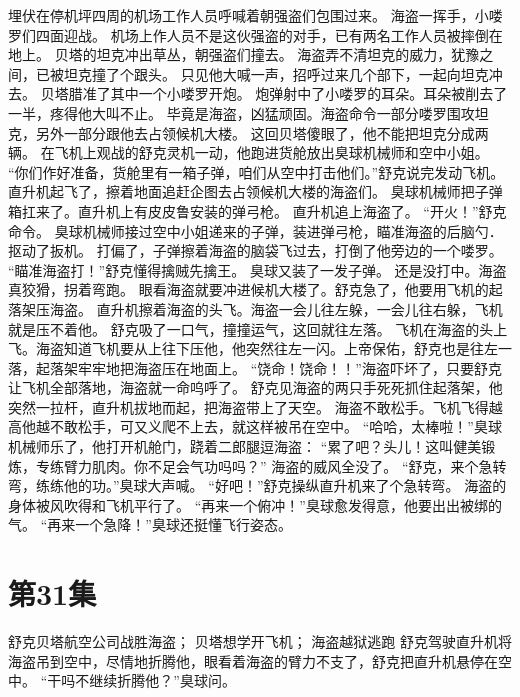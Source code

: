 \documentclass[a4paper,12pt,UTF8,twoside]{ctexbook}
\begin{document}
        埋伏在停机坪四周的机场工作人员呼喊着朝强盗们包围过来。 
        海盗一挥手，小喽罗们四面迎战。 
        机场上作人员不是这伙强盗的对手，已有两名工作人员被摔倒在地上。 
        贝塔的坦克冲出草丛，朝强盗们撞去。 
        海盗弄不清坦克的威力，犹豫之间，已被坦克撞了个跟头。 
        只见他大喊一声，招呼过来几个部下，一起向坦克冲去。 
        贝塔腊准了其中一个小喽罗开炮。 
        炮弹射中了小喽罗的耳朵。耳朵被削去了一半，疼得他大叫不止。 
        毕竟是海盗，凶猛顽固。海盗命令一部分喽罗围攻坦克，另外一部分跟他去占领候机大楼。 
        这回贝塔傻眼了，他不能把坦克分成两辆。 
        在飞机上观战的舒克灵机一动，他跑进货舱放出臭球机械师和空中小姐。 
        “你们作好准备，货舱里有一箱子弹，咱们从空中打击他们。”舒克说完发动飞机。 
        直升机起飞了，擦着地面追赶企图去占领候机大楼的海盗们。 
        臭球机械师把子弹箱扛来了。直升机上有皮皮鲁安装的弹弓枪。 
        直升机追上海盗了。 
        “开火！”舒克命令。 
        臭球机械师接过空中小姐递来的子弹，装进弹弓枪，瞄准海盗的后脑勺．抠动了扳机。 
        打偏了，子弹擦着海盗的脑袋飞过去，打倒了他旁边的一个喽罗。 
        “瞄准海盗打！”舒克懂得擒贼先擒王。 
        臭球又装了一发子弹。 
        还是没打中。海盗真狡猾，拐着弯跑。 
        眼看海盗就要冲进候机大楼了。舒克急了，他要用飞机的起落架压海盗。 
        直升机擦着海盗的头飞。海盗一会儿往左躲，一会儿往右躲，飞机就是压不着他。 
        舒克吸了一口气，撞撞运气，这回就往左落。 
        飞机在海盗的头上飞。海盗知道飞机要从上往下压他，他突然往左一闪。上帝保佑，舒克也是往左一落，起落架牢牢地把海盗压在地面上。 
        “饶命！饶命！！”海盗吓坏了，只要舒克让飞机全部落地，海盗就一命呜呼了。 
        舒克见海盗的两只手死死抓住起落架，他突然一拉杆，直升机拔地而起，把海盗带上了天空。 
        海盗不敢松手。飞机飞得越高他越不敢松手，可又义爬不上去，就这样被吊在空中。 
        “哈哈，太棒啦！”臭球机械师乐了，他打开机舱门，跷着二郎腿逗海盗： 
        “累了吧？头儿！这叫健美锻炼，专练臂力肌肉。你不足会气功吗吗？” 
         海盗的威风全没了。 
        “舒克，来个急转弯，练练他的功。”臭球大声喊。 
        “好吧！”舒克操纵直升机来了个急转弯。 
        海盗的身体被风吹得和飞机平行了。 
        “再来一个俯冲！”臭球愈发得意，他要出出被绑的气。 
        “再来一个急降！”臭球还挺懂飞行姿态。   \chapter{第31集} 
        舒克贝塔航空公司战胜海盗； 
        贝塔想学开飞机； 
        海盗越狱逃跑   
        舒克驾驶直升机将海盗吊到空中，尽情地折腾他，眼看着海盗的臂力不支了，舒克把直升机悬停在空中。 
        “干吗不继续折腾他？”臭球问。 
\end{document}
